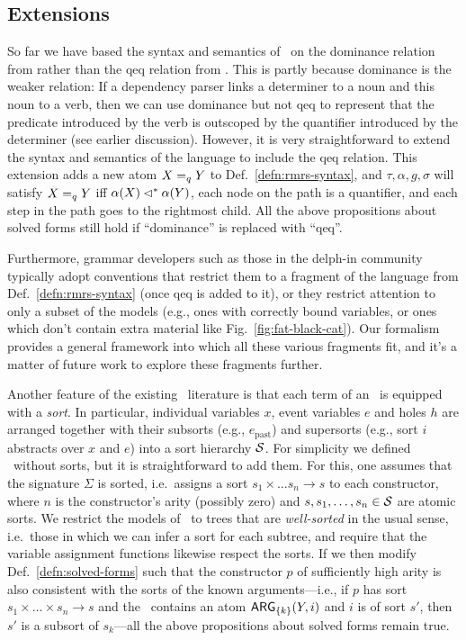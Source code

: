 \subsection{Extensions}
\label{sec:extensions}

So far we have based the syntax and semantics of \rmrs\ on the
dominance relation from  rather than the qeq
relation from .  This is partly because
dominance is the weaker relation: If a dependency parser links
a determiner to a noun and this noun to a verb, then we can use
dominance but not qeq to represent that the predicate introduced by
the verb is outscoped by the quantifier introduced by the determiner
(see earlier discussion).  However, it is very straightforward to
extend the syntax and semantics
of the language to include the qeq relation.
This extension adds a new atom $X =_q Y$ to
Def.~\ref{defn:rmrs-syntax}, and $\tau,\alpha,g,\sigma$ will satisfy
$X =_q Y$ iff $\alpha(X) \lhd^* \alpha(Y)$, each node on the path is a
quantifier, and each step in the path goes to the rightmost child. All
the above propositions about solved forms still hold if ``dominance''
is replaced with ``qeq''.

Furthermore, grammar developers such as those in the {\sc delph-in}
community typically adopt conventions that restrict them to a fragment
of the language from Def.~\ref{defn:rmrs-syntax} (once qeq is added to
it), or they restrict attention to only a subset of the models (e.g.,
ones with correctly bound variables, or ones which don't contain extra
material like Fig.~\ref{fig:fat-black-cat}).  Our formalism provides a
general framework into which all these various fragments fit, and it's
a matter of future work to explore these fragments further.

Another feature of the existing \rmrs\ literature is that each term of
an \rmrs\ is equipped with a \emph{sort}.  In particular, individual
variables $x$, event variables $e$ and holes $h$ are arranged together
with their subsorts (e.g., $e_{\mbox{past}}$) and supersorts (e.g.,
sort $i$ abstracts over $x$ and $e$) into a
sort hierarchy ${\cal S}$. 
For simplicity we defined \rmrs\ without sorts, but it is
straightforward to add them.  For this, one
assumes that the signature $\Sigma$ is sorted, i.e.\ assigns a sort
$s_1\times\ldots s_n\rightarrow s$ to each constructor, where $n$ is
the constructor's arity (possibly zero) and $s,s_1,\ldots,s_n\in {\cal
  S}$ are atomic sorts.  We restrict the models of \rmrs\ to trees
that are \emph{well-sorted} in the usual sense, i.e.\ those in which
we can infer a sort for each subtree, and require that the variable
assignment functions likewise respect the sorts.  If we then modify
Def.~\ref{defn:solved-forms} such that the constructor $p$ of
sufficiently high arity is also consistent with the sorts of the known
arguments---i.e., if $p$ has sort $s_1 \times \ldots \times s_n
\rightarrow s$ and the \rmrs\ contains an atom $\mathsf{ARG}_{\{k\}}(Y,i)$ and
$i$ is of sort $s'$, then $s'$ is a subsort of $s_k$---all the above
propositions about solved forms remain true.



